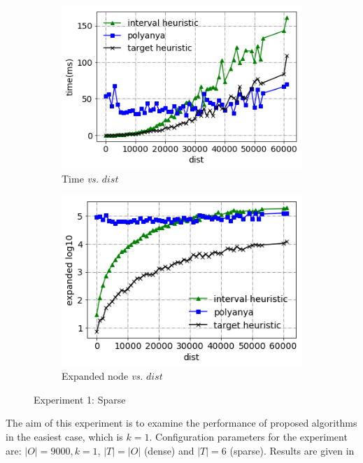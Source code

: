 \begin{figure}[!htbp]
    \centering
    \begin{subfigure}[b]{0.5\textwidth}
        \centering
        \includegraphics[width=.7\textwidth]{pic/e1_sparse_time.png}
        \caption{Time \textit{vs.} $dist$}
        \label{e1_sparse_time}
    \end{subfigure}%
    \hfill
    \begin{subfigure}[b]{0.5\textwidth}
        \centering
        \includegraphics[width=.7\textwidth]{pic/e1_sparse_gen.png}
        \caption{\small Expanded node \textit{vs.} $dist$}
        \label{e1_sparse_gen}
    \end{subfigure}
    \caption{\small Experiment 1: Sparse}

\end{figure}

The aim of this experiment is to examine the performance of proposed algorithms in the easiest case, which is $k=1$. Configuration parameters for the experiment are: $|O|=9000,k=1$, $|T|=|O|$ (dense) and $|T|=6$ (sparse). Results are given in


